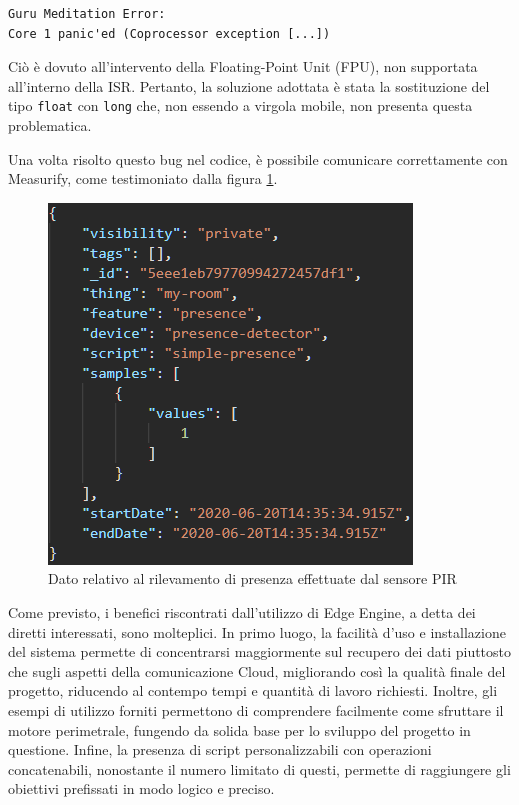 \begin{verbatim}
Guru Meditation Error: 
Core 1 panic'ed (Coprocessor exception [...])
\end{verbatim}

Ciò è dovuto all'intervento della Floating-Point Unit (FPU), non supportata all'interno della ISR. Pertanto, la soluzione adottata è stata la sostituzione del tipo \texttt{float} con \texttt{long} che, non essendo a virgola mobile, non presenta questa problematica.

Una volta risolto questo bug nel codice, è possibile comunicare correttamente con Measurify, come testimoniato dalla figura \ref{measacquario}.

\begin{figure}[H]
	\centering
	\includegraphics[width=0.6\linewidth]{pics/measacquario}
	\caption{Dato relativo al rilevamento di presenza effettuate dal sensore PIR}
	\label{measacquario}
\end{figure}

Come previsto, i benefici riscontrati dall'utilizzo di Edge Engine, a detta dei diretti interessati,  sono molteplici. In primo luogo, la facilità d'uso e installazione del sistema permette di concentrarsi maggiormente sul recupero dei dati piuttosto che sugli aspetti della comunicazione Cloud, migliorando così la qualità finale del progetto, riducendo al contempo tempi e quantità di lavoro richiesti. Inoltre, gli esempi di utilizzo forniti permettono di comprendere facilmente come sfruttare il motore perimetrale, fungendo da solida base per lo sviluppo del progetto in questione. Infine, la presenza di script personalizzabili con operazioni concatenabili, nonostante il numero limitato di questi, permette di raggiungere gli obiettivi prefissati in modo logico e preciso.

